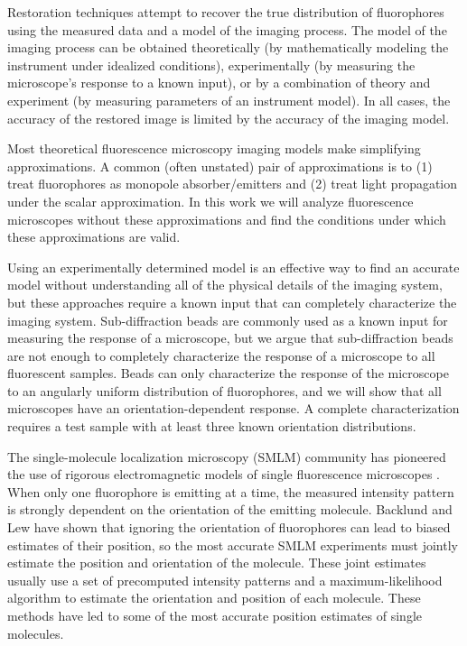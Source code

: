 \documentclass{osa-article}
\begin{document}
Restoration techniques attempt to recover the true distribution of fluorophores
using the measured data and a model of the imaging process. The model of the
imaging process can be obtained theoretically (by mathematically modeling the
instrument under idealized conditions), experimentally (by measuring the
microscope's response to a known input), or by a combination of theory and
experiment (by measuring parameters of an instrument model). In all cases, the
accuracy of the restored image is limited by the accuracy of the imaging model.

Most theoretical fluorescence microscopy imaging models make simplifying
approximations. A common (often unstated) pair of approximations is to (1) treat
fluorophores as monopole absorber/emitters and (2) treat light propagation under
the scalar approximation. In this work we will analyze fluorescence microscopes
without these approximations and find the conditions under which these
approximations are valid.

Using an experimentally determined model is an effective way to find an accurate
model without understanding all of the physical details of the imaging system,
but these approaches require a known input that can completely characterize the
imaging system. Sub-diffraction beads are commonly used as a known input for
measuring the response of a microscope, but we argue that sub-diffraction beads
are not enough to completely characterize the response of a microscope to all
fluorescent samples. Beads can only characterize the response of the microscope
to an angularly uniform distribution of fluorophores, and we will show that all
microscopes have an orientation-dependent response. A complete characterization
requires a test sample with at least three known orientation distributions.

The single-molecule localization microscopy (SMLM) community has pioneered the
use of rigorous electromagnetic models of single fluorescence microscopes
\cite{backer2014, lieb2004}. When only one fluorophore is emitting at a time,
the measured intensity pattern is strongly dependent on the orientation of the
emitting molecule. Backlund and Lew \cite{backlund2014} have shown that ignoring
the orientation of fluorophores can lead to biased estimates of their position,
so the most accurate SMLM experiments must jointly estimate the position and
orientation of the molecule. These joint estimates usually use a set of
precomputed intensity patterns and a maximum-likelihood algorithm to estimate
the orientation and position of each molecule. These methods have led to some of
the most accurate position estimates of single molecules.
\end{document}
